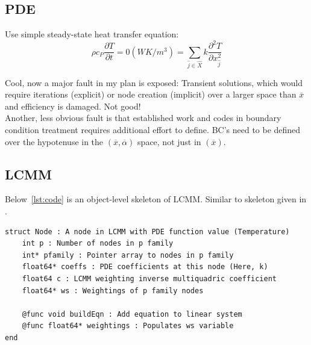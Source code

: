 \documentclass{article}
\begin{document}
\subsection{PDE}
Use simple steady-state heat transfer equation:\\
\begin{equation}
    \rho c_P \frac{\partial T}{\partial t} = 0 (WK/m^3) = \sum_{\hat{j}\in \hat{X}} k \frac{\partial ^2 T}{\partial x_{\hat{j}}^2}
\end{equation}

Cool, now a major fault in my plan is exposed: Transient solutions, which would require iterations (explicit) or node creation (implicit) over a larger space than $\overline{x}$ and efficiency is damaged. Not good!\\

Another, less obvious fault is that established work and codes in boundary condition treatment requires additional effort to define. BC's need to be defined over the hypotenuse in the $\left( \overline{x},\overline{\alpha}\right)$ space, not just in $\left( \overline{x}\right)$.\\

\subsection{LCMM}
Below~\ref{lst:code} is an object-level skeleton of LCMM. Similar to skeleton given in \cite{lcmm}.
\begin{lstlisting}[label={lst:code},caption={Node struct in LCMM}]
struct Node : A node in LCMM with PDE function value (Temperature)
    int p : Number of nodes in p family
    int* pfamily : Pointer array to nodes in p family
    float64* coeffs : PDE coefficients at this node (Here, k)
    float64 c : LCMM weighting inverse multiquadric coefficient
    float64* ws : Weightings of p family nodes
    
    @func void buildEqn : Add equation to linear system
    @func float64* weightings : Populates ws variable
end
\end{lstlisting}


\end{document}
